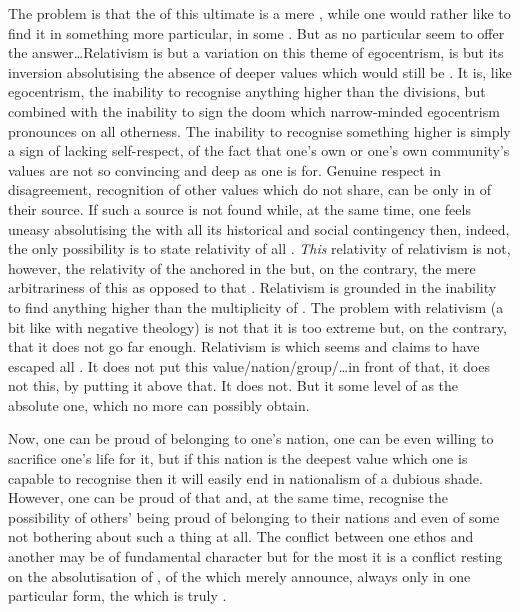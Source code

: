 \pa\label{pa:relativism} The problem is that the  of this ultimate
 is a mere , while one would rather like to find it in
something more particular, in some  . But as no
particular  seem to offer the answer\ldots Relativism is but a
variation on this theme of egocentrism, is but its inversion absolutising the
absence of deeper values which would still be . It is, like
egocentrism, the inability to recognise anything higher than the 
divisions, but combined with the inability to sign the doom which narrow-minded
egocentrism pronounces on all otherness. The inability to recognise something
higher is simply a sign of lacking self-respect, of the fact that one's own or
one's own community's values are not so convincing and deep as  one is
 for.  Genuine respect in disagreement, recognition of other
values which  do not share, can be  only in  of
their source. If such a source is not found while, at the same time, one feels
uneasy absolutising the  with all its historical and social contingency
then, indeed, the only possibility is to state relativity of all . {\em This} relativity of relativism is not, however, the relativity of
the  anchored in the  but, on the contrary,
the mere arbitrariness of this  as opposed to that .
Relativism is grounded in the inability to find anything higher than the
multiplicity of .  The problem with relativism (a bit like with
negative theology) is not that it is too extreme but, on the contrary, that it
does not go far enough. Relativism is  which seems and claims to
have escaped all . It does not put this value/nation/group/\ldots in
front of that, it does not  this, by putting it above that. It does
not. But it  some level of   as the
absolute one,  which no more  can possibly obtain.

\newpa
\pa
Now, one can be proud of belonging to one's nation, one can be even willing
to sacrifice one's life for it, but if this nation is the deepest value which
one is capable to recognise then it will easily end in
nationalism of a dubious shade. However, one can be proud of that and, at
the same time, recognise the possibility of others' being proud of belonging to
their nations and even of some not bothering about such a thing at all.  The
conflict between one ethos and another may be of fundamental character but for
the most it is a conflict resting on the absolutisation of , of the  which merely announce, always only in one
particular form, the  which is truly .

